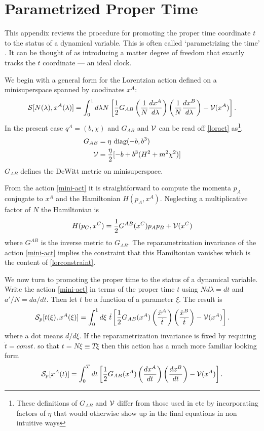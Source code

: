 \documentclass[prd,floats,superscriptaddress,eqsecnum,floatfix,nofootinbib,12pt]{revtex4}
\def\Nh{N}
\def\cS{{\cal  S}}
\def\be{\begin{equation}}
\def\ee{\end{equation}}
\def\cV{{\cal V}}
\begin{document}
{{{{\section{Parametrized Proper Time}
\label{paramproper}
This appendix reviews the procedure for promoting the proper time coordinate $t$ to the status of  a dynamical variable.
This is often called `parametrizing the time' \cite{Partime}. It can be thought of as introducing a matter degree of freedom that exactly tracks the $t$ coordinate --- an ideal clock. 

We begin with a general form for the Lorentzian action defined on a minisuperspace spanned by coodinates $x^A$:
\begin{equation}
\cS[N(\lambda),x^A(\lambda)] = \int^1_0 d\lambda \Nh  \left[\frac{1}{2} G_{AB} \left(\frac{1}{\Nh}\frac{dx^A}{d\lambda}\right) \left(\frac{1}{\Nh}\frac{dx^B}{d\lambda}\right) -\cV (x^A) \right] .
\label{mini-act}
\end{equation}
In the present case $q^A=(b,\chi)$ and $G_{AB}$ and $\cV$ can be read off \eqref{loract} as\footnote{These definitions of $G_{AB}$ and $\cV$ differ from those used in \cite{HHH08a,HH12b,HHH14} etc by incorporating factors of $\eta$ that would otherwise show up in the final equations in non intuitive ways}.
\begin{align}
\label{GV}
G_{AB}&=\eta \ {\rm diag} (-b,b^3) \nonumber \\
\cV&=\frac{\eta}{2}[-b +b^3(H^2+m^2\chi^2)]
\end{align}
$G_{AB}$ defines the DeWitt metric on minisuperspace. 

From the action \eqref{mini-act} it is straightforward to compute the momenta $p_A$ conjugate to $x^A$ and the Hamiltonian $H(p_A,x^A)$. Neglecting a multiplicative factor of $N$ the Hamiltonian is
\be
\label{Hconstr}
H(p_C,x^C) = \frac{1}{2} G^{AB}(x^C)p_Ap_B + \cV(x^C)
\ee
where $G^{AB}$ is the inverse metric to $G_{AB}$. The reparametrization invariance of the action \eqref{mini-act} implies the constraint that this Hamiltonian vanishes which is the content of \eqref{lorconstraint}. 

We now turn to promoting the proper time to the status of a dynamical variable.  Write the action \eqref{mini-act} in terms of the proper time $t$ using $Nd\lambda=dt$ and $a'/N=da/dt$. Then let $t$ be a function of a parameter $\xi$. The result is 
\be
\label{reparamact}
\cS_p[t(\xi),x^A(\xi)] = \int_0^1 d\xi \  {\dot t} \left[\frac{1}{2} G_{AB}(x^A) \left(\frac{\dot x^A}{\dot t}\right)\left(\frac{\dot x^B}{\dot t}\right)  -\cV (x^A) \right] .
\ee
where a dot means $d/d\xi$.  If the reparametrization invariance is fixed by requiring $\dot t=const.$ so that  $t=N\xi\equiv T\xi$ then this action has a much more familiar looking form  
\be
\label{rpa-fixed}
\cS_p[ x^A(t)] = \int_0^T dt  \left[\frac{1}{2} G_{AB}(x^A) \left(\frac{dx^A}{dt}\right)\left(\frac{dx^B}{dt}\right)  -\cV (x^A) \right] .
\ee

}}}}
\end{document}

